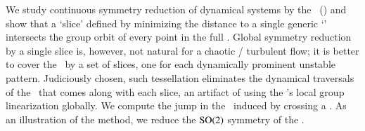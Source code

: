 
We study continuous symmetry reduction of dynamical systems
by the \mslices\ (\mframes) and show that a `slice'
defined by minimizing the distance to a single generic `{\template}'
intersects the group orbit of every point in the full {\statesp}. Global
symmetry reduction by a single slice is, however, not natural for a
chaotic / turbulent flow; it is better to cover the \reducedsp\ by a set
of slices, one for each dynamically prominent unstable pattern.
Judiciously chosen, such tessellation eliminates the dynamical traversals
of the \sset\ that comes along with each slice, an artifact of using the
{\template}'s local group linearization globally. We compute the jump in
the \reducedsp\ induced by crossing a \sset. As an illustration of the
method, we reduce the $\textrm{SO}(2)$ symmetry of the \cLe.

%

